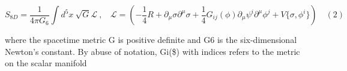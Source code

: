 \documentclass{article}
\begin{document}
\begin{equation}
S _ { 8 D } = \frac { 1 } { 4 \pi G _ { 6 } } \int d ^ { 5 } x ~ \sqrt { G } \mathcal { L } ~, ~ ~ ~ ~ \mathcal { L } = \left ( - \frac { 1 } { 4 } R + \partial _ { \mu } \sigma \partial ^ { \mu } \sigma + \frac { 1 } { 4 } G _ { i j } ( \phi ) \partial _ { \mu } \psi ^ { i } \partial ^ { \mu } \phi ^ { j } + V \{ \sigma, \phi ^ { i } \} \right ) \quad ( 2 )
\end{equation}


where the spacetime metric G is positive definite and G6 is the six-dimensional Newton's
constant. By abuse of notation, Gi(\$) with indices refers to the metric on the scalar manifold
\end{document}

